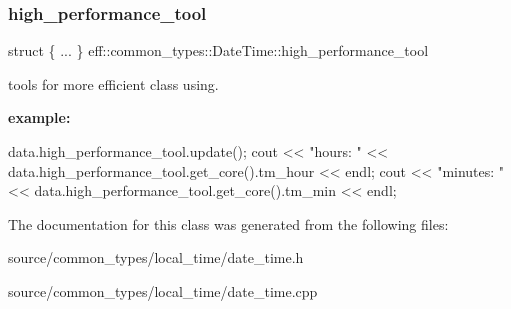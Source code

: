 \subsubsection{\texorpdfstring{high\+\_\+performance\+\_\+tool}{high\_performance\_tool}}
{\footnotesize\ttfamily struct \{ ... \}  eff\+::common\+\_\+types\+::\+Date\+Time\+::high\+\_\+performance\+\_\+tool}



tools for more efficient class using. 

{\bfseries example\+:} 
\begin{DoxyCode}
data.high\_performance\_tool.update();
cout << \textcolor{stringliteral}{"hours: "} << data.high\_performance\_tool.get\_core().tm\_hour << endl;
cout << \textcolor{stringliteral}{"minutes: "} << data.high\_performance\_tool.get\_core().tm\_min << endl;
\end{DoxyCode}
 

The documentation for this class was generated from the following files\+:\begin{DoxyCompactItemize}
\item 
source/common\+\_\+types/local\+\_\+time/date\+\_\+time.\+h\item 
source/common\+\_\+types/local\+\_\+time/date\+\_\+time.\+cpp\end{DoxyCompactItemize}
